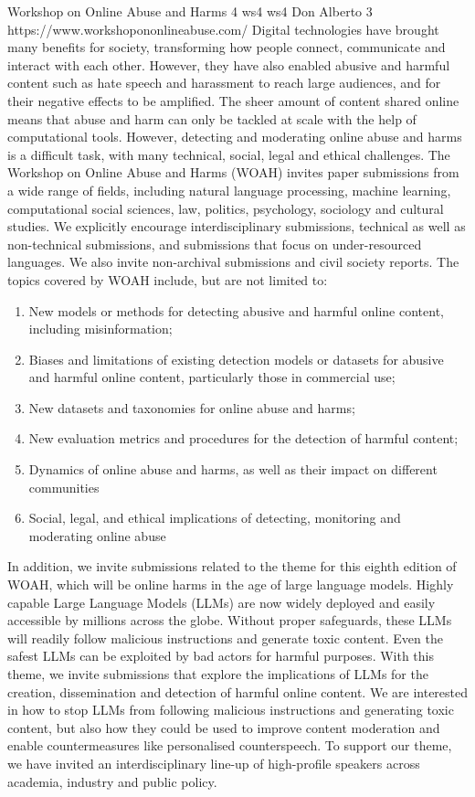 \begin{wsschedulenolist}
{Workshop on Online Abuse and Harms}
{4}
{ws4}
{ws4}
{Don Alberto 3}
{https://www.workshopononlineabuse.com/}
    Digital technologies have brought many benefits for society, transforming how people connect, communicate and interact with each other. However, they have also enabled abusive and harmful content such as hate speech and harassment to reach large audiences, and for their negative effects to be amplified. The sheer amount of content shared online means that abuse and harm can only be tackled at scale with the help of computational tools. However, detecting and moderating online abuse and harms is a difficult task, with many technical, social, legal and ethical challenges. The Workshop on Online Abuse and Harms (WOAH) invites paper submissions from a wide range of fields, including natural language processing, machine learning, computational social sciences, law, politics, psychology, sociology and cultural studies. We explicitly encourage interdisciplinary submissions, technical as well as non-technical submissions, and submissions that focus on under-resourced languages. We also invite non-archival submissions and civil society reports. The topics covered by WOAH include, but are not limited to:

\begin{enumerate}
    \item New models or methods for detecting abusive and harmful online content, including misinformation;
    \item Biases and limitations of existing detection models or datasets for abusive and harmful online content, particularly those in commercial use;
    \item New datasets and taxonomies for online abuse and harms;
    \item New evaluation metrics and procedures for the detection of harmful content;
    \item Dynamics of online abuse and harms, as well as their impact on different communities
    \item Social, legal, and ethical implications of detecting, monitoring and moderating online abuse
\end{enumerate}

In addition, we invite submissions related to the theme for this eighth edition of WOAH, which will be online harms in the age of large language models. Highly capable Large Language Models (LLMs) are now widely deployed and easily accessible by millions across the globe. Without proper safeguards, these LLMs will readily follow malicious instructions and generate toxic content. Even the safest LLMs can be exploited by bad actors for harmful purposes. With this theme, we invite submissions that explore the implications of LLMs for the creation, dissemination and detection of harmful online content. We are interested in how to stop LLMs from following malicious instructions and generating toxic content, but also how they could be used to improve content moderation and enable countermeasures like personalised counterspeech. To support our theme, we have invited an interdisciplinary line-up of high-profile speakers across academia, industry and public policy.
\end{wsschedulenolist}

